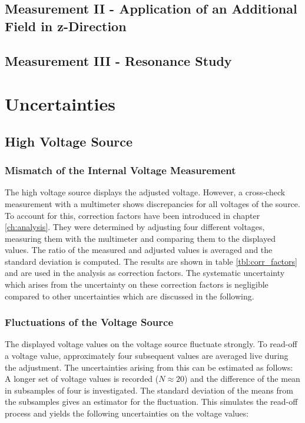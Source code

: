 \documentclass[
	paper=A4,
	parskip=full,
	chapterprefix=true,
	11pt,
	headings=normal,
	bibliography=totoc,
	listof=totoc,
	titlepage=on,
]{scrreprt}
\begin{document}
\section{Measurement II - Application of an Additional Field in z-Direction}
\section{Measurement III - Resonance Study}

\chapter{Uncertainties}
\label{ch:systematics}
\section{High Voltage Source}
\subsection{Mismatch of the Internal Voltage Measurement}
The high voltage source displays the adjusted voltage. However, a cross-check measurement with a multimeter shows discrepancies for all voltages of the source. To account for this, correction factors have been introduced in chapter \ref{ch:analysis}. They were determined by adjusting four different voltages, measuring them with the multimeter and comparing them to the displayed values. The ratio of the measured and adjusted values is averaged and the standard deviation is computed. The results are shown in table \ref{tbl:corr_factors} and are used in the analysis as correction factors. The systematic uncertainty which arises from the uncertainty on these correction factors is negligible compared to other uncertainties which are discussed in the following.

\subsection{Fluctuations of the Voltage Source}
The displayed voltage values on the voltage source fluctuate strongly. To read-off a voltage value, approximately four subsequent values are averaged live during the adjustment. The uncertainties arising from this can be estimated as follows: A longer set of voltage values is recorded ($N\approx20$) and the difference of the mean in subsamples of four is investigated. The standard deviation of the means from the subsamples gives an estimator for the fluctuation. This simulates the read-off process and yields the following uncertainties on the voltage values:
\end{document}
